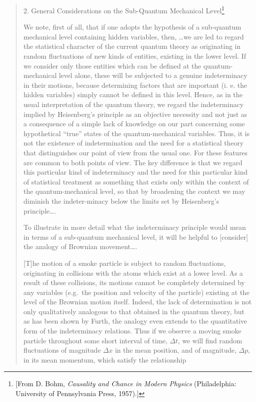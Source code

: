 \documentclass[11pt]{memoir}
\begin{document}
\begin{quote}
2. General Considerations on the Sub-Quantum Mechanical Level\footnote{{[}From
  D. Bohm, \emph{Causality and Chance in Modern Physics} (Philadelphia:
  University of Pennsylvania Press, 1957).{]}}

We note, first of all, that if one adopts the hypothesis of a
sub-quantum mechanical level containing hidden variables, then, \ldots we
are led to regard the statistical character of the current quantum
theory as originating in random fluctuations of new kinds of entities,
existing in the lower level. If we consider only those entities which
can be defined at the quantum-mechanical level alone, these will be
subjected to a genuine indeterminacy in their motions, because
determining factors that are important (i. e. the hidden variables)
simply cannot be defined in this level. Hence, as in the usual
interpretation of the quantum theory, we regard the indeterminacy
implied by Heisenberg's principle as an objective necessity and not just
as a consequence of a simple lack of knowledge on our part concerning
some hypothetical ``true'' states of the quantum-mechanical variables.
Thus, it is not the existence of indetermination and the need for a
statistical theory that distinguishes our point of view from the usual
one. For these features are common to both points of view. The key
difference is that we regard this particular kind of indeterminacy and
the need for this particular kind of statistical treatment as something
that exists only within the context of the quantum-mechanical level, so
that by broadening the context we may diminish the indeter-minacy below
the limits set by Heisenberg's principle\ldots.

To illustrate in more detail what the indeterminacy principle would mean
in terms of a sub-quantum mechanical level, it will be helpful to
{[}consider{]} the analogy of Brownian movement\ldots.

{[}T{]}he motion of a smoke particle is subject to random fluctuations,
originating in collisions with the atoms which exist at a lower level.
As a result of these collisions, its motions cannot be completely
determined by any variables (e.g.\ the position and velocity of the
particle) existing at the level of the Brownian motion itself. Indeed,
the lack of determination is not only qualitatively analogous to that
obtained in the quantum theory, but as has been shown by Furth, the
analogy even extends to the quantitative form of the indeterminacy
relations. Thus if we observe a moving smoke particle throughout some
short interval of time, $\Delta t$, we will find random fluctuations of
magnitude $\Delta x$ in the mean position, and of magnitude, $\Delta p$,
in its mean momentum, which satisfy the relationship


\end{quote}
\end{document}
